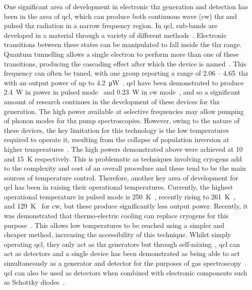 One significant area of development in electronic \acrshort{thz} generation and detection has been in the area of \acrfull{qcl}, which can produce both continuous wave (\acrshort{cw}) \acrshort{thz} and pulsed \acrshort{thz} radiation in a narrow frequency region. In \acrshort{qcl}, sub\nobreakdash-bands are developed in a material through a variety of different methods~\cite{Williams2007}. Electronic transitions between these states can be manipulated to fall inside the \acrshort{thz} range. Quantum tunnelling allows a single electron to perform more than one of these transitions, producing the cascading effect after which the device is named~\cite{Faist1994}.
This frequency can often be tuned, with one group reporting a range of 2.06 – \SI{4.65}{\acrshort{thz}} with an output power of up to \SI{4.2}{\micro W}~\cite{Lu2016}. 
\acrshort{qcl} have been demonstrated to produce \SI{2.4}{W} in power in pulsed mode~\cite{Lin2017} and \SI{0.23}{W} in \acrshort{cw} mode~\cite{Wang2016}, and so a significant amount of research continues in the development of these devices for \acrshort{thz} generation. The high power available at selective frequencies may allow pumping of phonon modes for \acrshort{thz} pump spectroscopies. 
However, owing to the nature of these devices, the key limitation for this technology is the low temperatures required to operate it, resulting from the collapse of population inversion at higher temperatures~\cite{Williams2007}. The high powers demonstrated above were achieved at 10 and \SI{15}{K} respectively. This is problematic as techniques involving cryogens add to the complexity and cost of an overall procedure and these tend to be the main sources of temperature control. Therefore, another key area of development for \acrshort{qcl} has been in raising their operational temperatures. Currently, the highest operational temperature in pulsed mode is \SI{250}{K}~\cite{Khalatpour2020}, recently rising to \SI{261}{K}~\cite{Khalatpour2022}, and \SI{129}{K}~\cite{Biermann2014} for \acrshort{cw}, but these produce significantly less output power.
Recently, it was demonstrated that thermo\nobreakdash-electric cooling can replace cryogens for this purpose~\cite{Kainz2019}. This allows low temperatures to be reached using a simpler and cheaper method, increasing the accessibility of this technique.
Whilst simply operating \acrshort{qcl}, they only act as \acrshort{thz} generators but through self\nobreakdash-mixing~\cite{Keeley2017}, \acrshort{qcl} can act as detectors and a single device has been demonstrated as being able to act simultaneously as a generator and detector for the purposes of gas spectroscopy~\cite{Linfield2018}. \acrshort{qcl} can also be used as detectors when combined with electronic components such as Schottky diodes~\cite{Wanke2010}.
